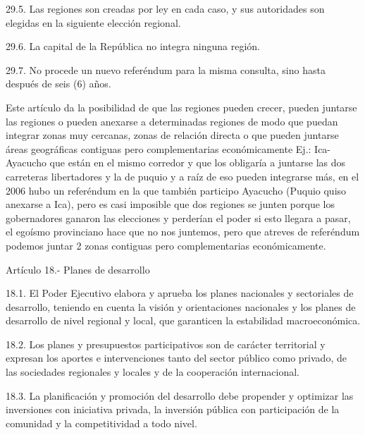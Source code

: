 \documentclass[
  letterpaper,
  DIV=11,
  numbers=noendperiod]{scrartcl}
\begin{document}
29.5. Las regiones son creadas por ley en cada caso, y sus autoridades
son elegidas en la siguiente elección regional.

29.6. La capital de la República no integra ninguna región.

29.7. No procede un nuevo referéndum para la misma consulta, sino hasta
después de seis (6) años.

Este artículo da la posibilidad de que las regiones pueden crecer,
pueden juntarse las regiones o pueden anexarse a determinadas regiones
de modo que puedan integrar zonas muy cercanas, zonas de relación
directa o que pueden juntarse áreas geográficas contiguas pero
complementarias económicamente Ej.: Ica-Ayacucho que están en el mismo
corredor y que los obligaría a juntarse las dos carreteras libertadores
y la de puquio y a raíz de eso pueden integrarse más, en el 2006 hubo un
referéndum en la que también participo Ayacucho (Puquio quiso anexarse a
Ica), pero es casi imposible que dos regiones se junten porque los
gobernadores ganaron las elecciones y perderían el poder si esto llegara
a pasar, el egoísmo provinciano hace que no nos juntemos, pero que
atreves de referéndum podemos juntar 2 zonas contiguas pero
complementarias económicamente.

Artículo 18.- Planes de desarrollo

18.1. El Poder Ejecutivo elabora y aprueba los planes nacionales y
sectoriales de desarrollo, teniendo en cuenta la visión y orientaciones
nacionales y los planes de desarrollo de nivel regional y local, que
garanticen la estabilidad macroeconómica.

18.2. Los planes y presupuestos participativos son de carácter
territorial y expresan los aportes e intervenciones tanto del sector
público como privado, de las sociedades regionales y locales y de la
cooperación internacional.

18.3. La planificación y promoción del desarrollo debe propender y
optimizar las inversiones con iniciativa privada, la inversión pública
con participación de la comunidad y la competitividad a todo nivel.
\end{document}
